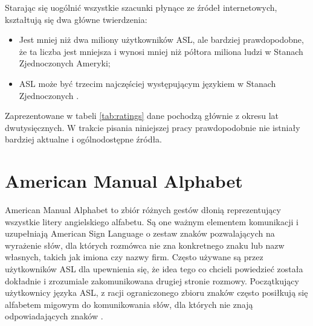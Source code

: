 \documentclass[a4paper,12pt,oneside]{book} %
\begin{document}
Starając się uogólnić wszystkie szacunki płynące ze źródeł internetowych, kształtują się dwa główne twierdzenia:
\begin{itemize}
	\item Jest mniej niż dwa miliony użytkowników ASL, ale bardziej prawdopodobne, że ta liczba jest mniejsza i wynosi mniej niż półtora miliona ludzi w Stanach Zjednoczonych Ameryki;
	\item ASL może być trzecim najczęściej występującym językiem w Stanach Zjednoczonych \cite{population}.
\end{itemize}

Zaprezentowane w tabeli \ref{tab:ratings} dane pochodzą głównie z okresu lat dwutysięcznych. W trakcie pisania niniejszej pracy prawdopodobnie nie istniały bardziej aktualne i ogólnodostępne źródła.

\section{American Manual Alphabet}
American Manual Alphabet to zbiór różnych gestów dłonią reprezentujący wszystkie litery angielskiego alfabetu. Są one ważnym elementem komunikacji i uzupełniają American Sign Language o zestaw znaków pozwalających na wyrażenie słów, dla których rozmówca nie zna konkretnego znaku lub nazw własnych, takich jak imiona czy nazwy firm. Często używane są przez użytkowników ASL dla upewnienia się, że idea tego co chcieli powiedzieć została dokładnie i zrozumiale zakomunikowana drugiej stronie rozmowy. Początkujący użytkownicy języka ASL, z racji ograniczonego zbioru znaków często posiłkują się alfabetem migowym do komunikowania słów, dla których nie znają odpowiadających znaków \cite{costello}.
\end{document}
